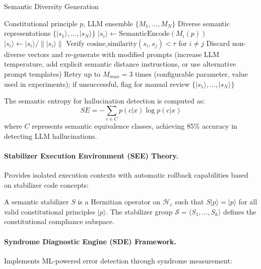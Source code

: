 \documentclass[manuscript,screen,9pt]{acmart}
\begin{document}
\begin{algorithm}[H]
	\caption{Semantic Diversity Generation}
	\label{alg:semantic_diversity}
	\begin{algorithmic}[1]
		\Require Constitutional principle $p$, LLM ensemble $\{M_1, \ldots, M_N\}$
		\Ensure Diverse semantic representations $\{|s_1\rangle, \ldots, |s_N\rangle\}$
		\State $|s_i\rangle \leftarrow \text{SemanticEncode}(M_i(p))$
		\State $|s_i\rangle \leftarrow |s_i\rangle / \||s_i\rangle\|$ 
		\EndFor
		\State Verify $\text{cosine\_similarity}(s_i, s_j) < \tau$ for $i \neq j$ 
		\State Discard non-diverse vectors and re-generate with modified prompts (increase LLM temperature, add explicit semantic distance instructions, or use alternative prompt templates)
		\State Retry up to $M_{max} = 3$ times (configurable parameter, value used in experiments); if unsuccessful, flag for manual review
		\EndIf
		\State \Return $\{|s_1\rangle, \ldots, |s_N\rangle\}$
	\end{algorithmic}
\end{algorithm}

The semantic entropy for hallucination detection is computed as:
$$SE = -\sum_{c \in C} p(c|x) \log p(c|x)$$
where $C$ represents semantic equivalence classes, achieving 85\% accuracy in detecting LLM hallucinations.

\paragraph{Stabilizer Execution Environment (SEE) Theory.} Provides isolated execution contexts with automatic rollback capabilities based on stabilizer code concepts:

\begin{definition}
	A semantic stabilizer $S$ is a Hermitian operator on $\mathcal{H}_c$ such that $S|p\rangle = |p\rangle$ for all valid constitutional principles $|p\rangle$. The stabilizer group $\mathcal{S} = \langle S_1, \ldots, S_k \rangle$ defines the constitutional compliance subspace.
\end{definition}

\paragraph{Syndrome Diagnostic Engine (SDE) Framework.} Implements ML-powered error detection through syndrome measurement:
\end{document}
